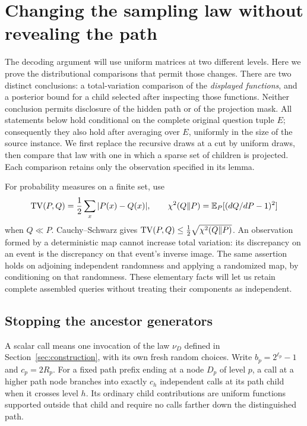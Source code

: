 \section{Changing the sampling law without revealing the path}
\label{sec:sampling}

The decoding argument will use uniform matrices at two different levels.
Here we prove the distributional comparisons that permit those changes.
There are two distinct conclusions: a total-variation comparison of the
\emph{displayed functions}, and a posterior bound for a child selected after
inspecting those functions.  Neither conclusion permits disclosure of the
hidden path or of the projection mask.  All statements below hold conditional
on the complete original question tuple $E$; consequently they also hold after
averaging over $E$, uniformly in the size of the source instance.
We first replace the recursive draws at a cut by uniform draws, then compare
that law with one in which a sparse set of children is projected.  Each
comparison retains only the observation specified in its lemma.

For probability measures on a finite set, use
\[
 \operatorname{TV}(P,Q)=\frac12\sum_x|P(x)-Q(x)|,
 \qquad
 \chi^2(Q\Vert P)=\mathbb E_P[(dQ/dP-1)^2]
\]
when $Q\ll P$.  Cauchy--Schwarz gives
$\operatorname{TV}(P,Q)\le\tfrac12\sqrt{\chi^2(Q\Vert P)}$.
An observation formed by a deterministic map cannot increase total variation:
its discrepancy on an event is the discrepancy on that event's inverse image.
The same assertion holds on adjoining independent randomness and applying a
randomized map, by conditioning on that randomness.  These elementary facts
will let us retain complete assembled queries without treating their
components as independent.

\subsection{Stopping the ancestor generators}

A scalar call means one invocation of the law $\nu_D$ defined in
Section~\ref{sec:construction}, with its own fresh random choices.  Write
$b_p=2^{\ell_p}-1$ and $c_p=2R_p$.  For a fixed path prefix ending at a node
$D_p$ of level $p$, a call at a higher path node branches into exactly $c_h$
independent calls at its path child when it crosses level $h$.  Its ordinary
child contributions are uniform functions supported outside that child and
require no calls farther down the distinguished path.


